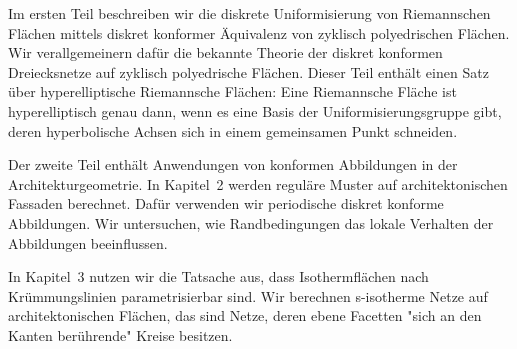 \documentclass[Thesis.tex]{subfiles}
\begin{document}
Im ersten Teil beschreiben wir die diskrete Uniformisierung von Riemannschen Fl\"{a}chen mittels diskret konformer \"{A}quivalenz von zyklisch polyedrischen Fl\"{a}chen.
Wir verallgemeinern daf\"{u}r die bekannte Theorie der diskret konformen Dreiecksnetze auf zyklisch polyedrische Fl\"{a}chen.
Dieser Teil enth\"{a}lt einen Satz \"{u}ber hyperelliptische Riemannsche Fl\"{a}chen: 
Eine Riemannsche Fl\"{a}che ist hyperelliptisch genau dann, wenn es eine Basis der Uniformisierungsgruppe gibt, deren hyperbolische Achsen sich in einem gemeinsamen Punkt schneiden.


Der zweite Teil enth\"{a}lt Anwendungen von konformen Abbildungen in der Architekturgeometrie.
In Kapitel~2 werden regul\"{a}re Muster auf architektonischen Fassaden berechnet.
Daf\"{u}r verwenden wir periodische diskret konforme Abbildungen.
Wir untersuchen, wie Randbedingungen das lokale Verhalten der Abbildungen beeinflussen.

In Kapitel~3 nutzen wir die Tatsache aus, dass Isothermfl\"{a}chen nach Kr\"{u}mmungslinien parametrisierbar sind.
Wir berechnen s-isotherme Netze auf architektonischen Fl\"{a}chen, das sind Netze, deren ebene Facetten "sich an den Kanten ber\"{u}hrende" Kreise besitzen.
\end{document}
